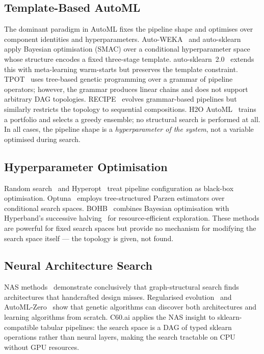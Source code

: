 \documentclass{article}
\theoremstyle{definition}
\theoremstyle{plain}
\theoremstyle{remark}
\begin{document}
\subsection{Template-Based AutoML}

The dominant paradigm in AutoML fixes the pipeline shape and optimises over
component identities and hyperparameters.
Auto-WEKA~\cite{thornton2013auto} and auto-sklearn~\cite{feurer2015efficient}
apply Bayesian optimisation (SMAC) over a conditional hyperparameter space
whose structure encodes a fixed three-stage template.
auto-sklearn~2.0~\cite{feurer2020autosklearn2} extends this with meta-learning
warm-starts but preserves the template constraint.
TPOT~\cite{olson2016tpot} uses tree-based genetic programming over a grammar
of pipeline operators; however, the grammar produces linear chains and
does not support arbitrary DAG topologies.
RECIPE~\cite{de2017recipe} evolves grammar-based pipelines but similarly
restricts the topology to sequential compositions.
H2O AutoML~\cite{ledell2020h2o} trains a portfolio and selects a greedy
ensemble; no structural search is performed at all.
In all cases, the pipeline shape is a \emph{hyperparameter of the system},
not a variable optimised during search.

\subsection{Hyperparameter Optimisation}

Random search~\cite{bergstra2012random} and Hyperopt~\cite{bergstra2013making}
treat pipeline configuration as black-box optimisation.
Optuna~\cite{akiba2019optuna} employs tree-structured Parzen estimators over
conditional search spaces.
BOHB~\cite{falkner2018bohb} combines Bayesian optimisation with Hyperband's
successive halving~\cite{li2017hyperband} for resource-efficient exploration.
These methods are powerful for fixed search spaces but provide no mechanism
for modifying the search space itself — the topology is given, not found.

\subsection{Neural Architecture Search}

NAS methods~\cite{zoph2017neural,liu2018darts,real2019regularized} demonstrate
conclusively that graph-structural search finds architectures that handcrafted
design misses.
Regularised evolution~\cite{real2019regularized} and AutoML-Zero~\cite{real2020automl}
show that genetic algorithms can discover both architectures and learning
algorithms from scratch.
C60.ai applies the NAS insight to sklearn-compatible tabular pipelines: the
search space is a DAG of typed sklearn operations rather than neural layers,
making the search tractable on CPU without GPU resources.
\end{document}
